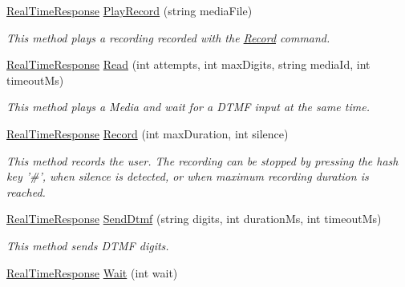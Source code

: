 \begin{DoxyCompactItemize}
\hyperlink{class_thecallr_api_1_1_objects_1_1_real_time_1_1_real_time_response}{Real\+Time\+Response} \hyperlink{class_thecallr_api_1_1_services_1_1_server_1_1_real_time_service_ae638ea9bbf631fda1281445ba73d7ce3}{Play\+Record} (string media\+File)
\begin{DoxyCompactList}\small\item\em This method plays a recording recorded with the \hyperlink{class_thecallr_api_1_1_services_1_1_server_1_1_real_time_service_a72d665b9e464c3a8fe992217efc4d945}{Record} command. \end{DoxyCompactList}\item 
\hyperlink{class_thecallr_api_1_1_objects_1_1_real_time_1_1_real_time_response}{Real\+Time\+Response} \hyperlink{class_thecallr_api_1_1_services_1_1_server_1_1_real_time_service_a532fa874454f105002b2b21d437dd5ea}{Read} (int attempts, int max\+Digits, string media\+Id, int timeout\+Ms)
\begin{DoxyCompactList}\small\item\em This method plays a Media and wait for a D\+T\+M\+F input at the same time. \end{DoxyCompactList}\item 
\hyperlink{class_thecallr_api_1_1_objects_1_1_real_time_1_1_real_time_response}{Real\+Time\+Response} \hyperlink{class_thecallr_api_1_1_services_1_1_server_1_1_real_time_service_a72d665b9e464c3a8fe992217efc4d945}{Record} (int max\+Duration, int silence)
\begin{DoxyCompactList}\small\item\em This method records the user. The recording can be stopped by pressing the hash key '\#', when silence is detected, or when maximum recording duration is reached. \end{DoxyCompactList}\item 
\hyperlink{class_thecallr_api_1_1_objects_1_1_real_time_1_1_real_time_response}{Real\+Time\+Response} \hyperlink{class_thecallr_api_1_1_services_1_1_server_1_1_real_time_service_a3ad6d4a674103c9f46b91616cbacdcf6}{Send\+Dtmf} (string digits, int duration\+Ms, int timeout\+Ms)
\begin{DoxyCompactList}\small\item\em This method sends D\+T\+M\+F digits. \end{DoxyCompactList}\item 
\hyperlink{class_thecallr_api_1_1_objects_1_1_real_time_1_1_real_time_response}{Real\+Time\+Response} \hyperlink{class_thecallr_api_1_1_services_1_1_server_1_1_real_time_service_accc4c5a802e762bc960c28f8eec7a369}{Wait} (int wait)

\end{DoxyCompactItemize}
